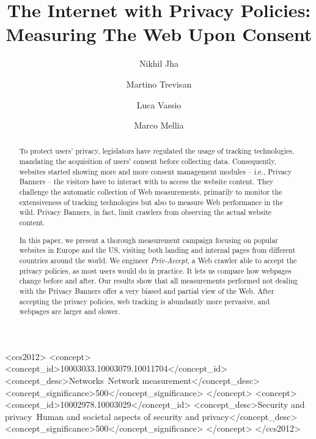 \documentclass[acmsmall]{acmart}
\newcommand{\TOOL}{{\emph{Priv-Accept}}\xspace}
\begin{document}
\title[The Internet with Privacy Policies]{The Internet with Privacy Policies: Measuring The Web Upon Consent}

\author{Nikhil Jha}

\author{Martino Trevisan}

\author{Luca Vassio}

\author{Marco Mellia}

\begin{abstract}
To protect users' privacy, legislators have regulated the usage of tracking technologies, mandating the acquisition of users' consent before collecting data. Consequently, websites started showing more and more consent management modules -- i.e., Privacy Banners -- the visitors have to interact with to access the website content. They challenge the automatic collection of Web measurements, primarily to monitor the extensiveness of tracking technologies but also to measure Web performance in the wild. Privacy Banners, in fact, limit crawlers from observing the actual website content.

In this paper, we present a thorough measurement campaign focusing on popular websites in Europe and the US, visiting both landing and internal pages from different countries around the world. We engineer \TOOL, a Web crawler able to accept the privacy policies, as most users would do in practice. It lets us compare how webpages change before and after. Our results show that all measurements performed not dealing with the Privacy Banners offer a very biased and partial view of the Web. After accepting the privacy policies, web tracking is abundantly more pervasive, and webpages are larger and slower.
\end{abstract}

\begin{CCSXML}
<ccs2012>
   <concept>
       <concept_id>10003033.10003079.10011704</concept_id>
       <concept_desc>Networks~Network measurement</concept_desc>
       <concept_significance>500</concept_significance>
       </concept>
   <concept>
       <concept_id>10002978.10003029</concept_id>
       <concept_desc>Security and privacy~Human and societal aspects of security and privacy</concept_desc>
       <concept_significance>500</concept_significance>
       </concept>
 </ccs2012>
\end{CCSXML}
\end{document}
